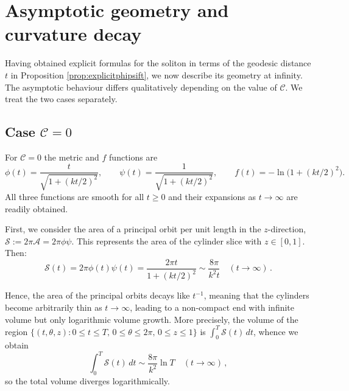 \documentclass[12pt,a4paper,reqno]{amsart}
\theoremstyle{plain}
\theoremstyle{remark}
\numberwithin{equation}{section}
\newcommand{\cA}{\mathcal{A}}
\newcommand{\cC}{\mathcal{C}}
\newcommand{\cS}{\mathcal{S}}
\begin{document}

\section{Asymptotic geometry and curvature decay}
\label{sec:asymptotics}

Having obtained explicit formulas for the soliton in terms of the geodesic distance $t$ in Proposition \ref{prop:explicitphipsift}, we now describe its geometry at infinity. The asymptotic behaviour differs qualitatively depending on the value of $\cC$. We treat the two cases separately.

\subsection{Case $\cC=0$}

For $\cC=0$ the metric and $f$ functions are
\begin{equation*}
\phi(t)=\frac{t}{\sqrt{1+(kt/2)^2}},\qquad 
\psi(t)=\frac{1}{\sqrt{1+(kt/2)^2}},\qquad 
f(t)=-\ln\big(1+(kt/2)^2\big).
\end{equation*}
All three functions are smooth for all $t\ge 0$ and their expansions as $t\to\infty$ are readily obtained.

First, we consider the area of a principal orbit per unit length in the $z$-direction, $\cS:=2\pi\cA=2\pi\phi\psi$. This represents the area of the cylinder slice with $z\in[0,1]$. Then:
\begin{equation*}
\cS(t) = 2\pi\phi(t)\psi(t) = \frac{2\pi t}{1+(kt/2)^2} \sim \frac{8\pi}{k^2 t} \quad (t\to\infty) \,.
\end{equation*}

Hence, the area of the principal orbits decays like $t^{-1}$, meaning that the cylinders become arbitrarily thin as $t\to\infty$, leading to a non‑compact end with infinite volume but only logarithmic volume growth. More precisely, the volume of the region  
$\{(t,\theta,z): 0\le t\le T,\, 0\le\theta\le2\pi, \, 0\le z\le 1\}$ is  
$\int_0^T \cS(t)\,dt$, whence we obtain
\begin{equation*}
\int_0^T \cS(t) \,dt \sim \frac{8\pi}{k^2}\ln T  \quad (t\to\infty) \,,
\end{equation*}
so the total volume diverges logarithmically.
\end{document}
